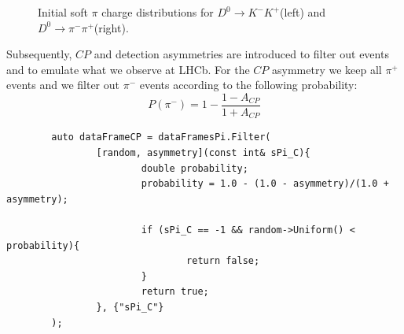 \documentclass{article}
\begin{document}
    \begin{figure}[h!]
        \centering
        \caption{Initial soft $\pi$ charge distributions for $D^{0}\to K^-K^+$(left) and $D^{0}\to \pi^-\pi^+$(right).}
    \end{figure}

    Subsequently, $CP$ and detection asymmetries are introduced to filter out events and to emulate what we observe at LHCb.
    For the $CP$ asymmetry we keep all $\pi^+$ events and we filter out $\pi^-$ events according to the following probability:
    \begin{equation}
        P(\pi^-) = 1 - \frac{1 - A_{CP}}{1 + A_{CP}}
    \end{equation}

    \begin{lstlisting}
        auto dataFrameCP = dataFramesPi.Filter(
                [random, asymmetry](const int& sPi_C){
                        double probability;
                        probability = 1.0 - (1.0 - asymmetry)/(1.0 + asymmetry);

                        if (sPi_C == -1 && random->Uniform() < probability){
                                return false;
                        }
                        return true;
                }, {"sPi_C"}
        );
    \end{lstlisting}
\end{document}
